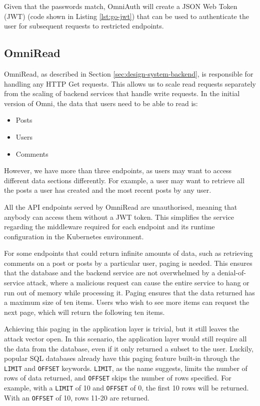 Given that the passwords match, OmniAuth will create a JSON Web Token (JWT) (code shown in Listing \ref{lst:go-jwt}) that can be used to authenticate the user for subsequent requests to restricted endpoints.



\subsection{OmniRead}
OmniRead, as described in Section \ref{sec:design-system-backend}, is responsible for handling any HTTP Get requests. This allows us to scale read requests separately from the scaling of backend services that handle write requests.
In the initial version of Omni, the data that users need to be able to read is: 
\begin{itemize}
    \item Posts
    \item Users
    \item Comments
\end{itemize}
However, we have more than three endpoints, as users may want to access different data sections differently. For example, a user may want to retrieve all the posts a user has created and the most recent posts by any user. 

All the API endpoints served by OmniRead are unauthorised, meaning that anybody can access them without a JWT token. This simplifies the service regarding the middleware required for each endpoint and its runtime configuration in the Kubernetes environment. 

For some endpoints that could return infinite amounts of data, such as retrieving comments on a post or posts by a particular user, paging is needed.
This ensures that the database and the backend service are not overwhelmed by a denial-of-service attack, where a malicious request can cause the entire service to hang or run out of memory while processing it. 
Paging ensures that the data returned has a maximum size of ten items. Users who wish to see more items can request the next page, which will return the following ten items.

Achieving this paging in the application layer is trivial, but it still leaves the attack vector open. In this scenario, the application layer would still require all the data from the database, even if it only returned a subset to the user. 
Luckily, popular SQL databases already have this paging feature built-in through the \verb|LIMIT| and \verb|OFFSET| keywords.
\verb|LIMIT|, as the name suggests, limits the number of rows of data returned, and \verb|OFFSET| skips the number of rows specified.
For example, with a \verb|LIMIT| of 10 and \verb|OFFSET| of 0, the first 10 rows will be returned. With an \verb|OFFSET| of 10, rows 11-20 are returned. 

